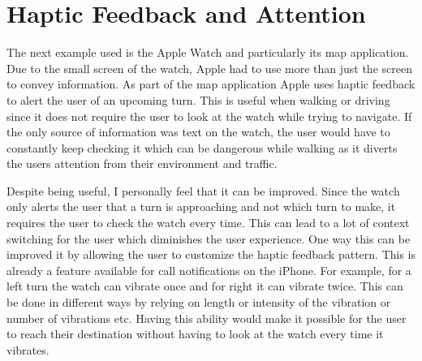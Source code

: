 \documentclass[12pt]{article}
\begin{document}
	\section{Haptic Feedback and Attention}
	The next example used is the Apple Watch and particularly its map application. Due to the small screen of the watch, Apple had to use more than just the screen to convey information. As part of the map application Apple uses haptic feedback to alert the user of an upcoming turn. This is useful when walking or driving since it does not require the user to look at the watch while trying to navigate. If the only source of information was text on the watch, the user would have to constantly keep checking it which can be dangerous while walking as it diverts the users attention from their environment and traffic. 
	
	Despite being useful, I personally feel that it can be improved. Since the watch only alerts the user that a turn is approaching and not which turn to make, it requires the user to check the watch every time. This can lead to a lot of context switching for the user which diminishes the user experience. One way this can be improved it by allowing the user to customize the haptic feedback pattern. This is already a feature available for call notifications on the iPhone. For example, for a left turn the watch can vibrate once and for right it can vibrate twice. This can be done in different ways by relying on length or intensity of the vibration or number of vibrations etc. Having this ability would make it possible for the user to reach their destination without having to look at the watch every time it vibrates.
	
\end{document}

